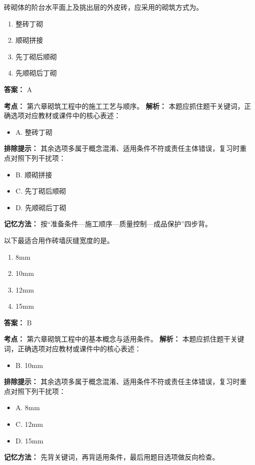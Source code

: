 \documentclass[UTF8,fontset=fandol,11pt]{ctexart}
\begin{document}
\begin{quizbox}[title={第 15 题}]
砖砌体的阶台水平面上及挑出层的外皮砖，应采用的砌筑方式为。\\
\begin{enumerate}[label=\Alph*.]
\item 整砖丁砌
\item 顺砌拼接
\item 先丁砌后顺砌
\item 先顺砌后丁砌
\end{enumerate}
\textbf{答案：} A
\vspace{0.25em}
\begin{answerbox}[title={考点解析}]
\textbf{考点：} 第六章砌筑工程中的施工工艺与顺序。
\textbf{解析：} 本题应抓住题干关键词，正确选项对应教材或课件中的核心表述：
\begin{itemize}
\item A. 整砖丁砌
\end{itemize}
\textbf{排除提示：} 其余选项多属于概念混淆、适用条件不符或责任主体错误，复习时重点对照下列干扰项：
\begin{itemize}
\item B. 顺砌拼接
\item C. 先丁砌后顺砌
\item D. 先顺砌后丁砌
\end{itemize}
\textbf{记忆方法：} 按“准备条件—施工顺序—质量控制—成品保护”四步背。
\end{answerbox}
\end{quizbox}

\begin{quizbox}[title={第 16 题}]
以下最适合用作砖墙灰缝宽度的是。\\
\begin{enumerate}[label=\Alph*.]
\item 8mm
\item 10mm
\item 12mm
\item 15mm
\end{enumerate}
\textbf{答案：} B
\vspace{0.25em}
\begin{answerbox}[title={考点解析}]
\textbf{考点：} 第六章砌筑工程中的基本概念与适用条件。
\textbf{解析：} 本题应抓住题干关键词，正确选项对应教材或课件中的核心表述：
\begin{itemize}
\item B. 10mm
\end{itemize}
\textbf{排除提示：} 其余选项多属于概念混淆、适用条件不符或责任主体错误，复习时重点对照下列干扰项：
\begin{itemize}
\item A. 8mm
\item C. 12mm
\item D. 15mm
\end{itemize}
\textbf{记忆方法：} 先背关键词，再背适用条件，最后用题目选项做反向检查。
\end{answerbox}
\end{quizbox}
\end{document}
